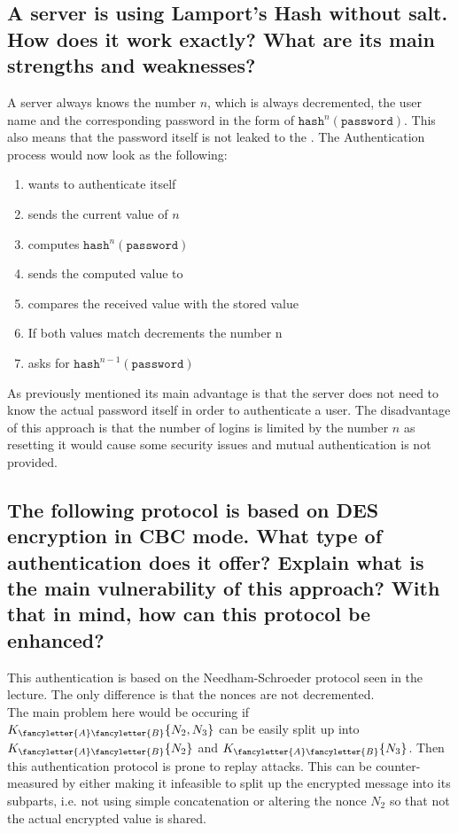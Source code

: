 \documentclass{report}
\begin{document}
		\subsection{A server is using Lamport’s Hash without salt. How does it work exactly? What are its main strengths and weaknesses?}
		\startsubsection
			A server  always knows the number $n$, which is always decremented, the user name and the corresponding password in the form of $\texttt{hash}^n(\texttt{password})$. This also means that the password itself is not leaked to the . The Authentication process would now look as the following:
			\begin{enumerate}
				\item {} wants to authenticate itself
				\item {} sends  the current value of $n$
				\item {} computes $\texttt{hash}^n(\texttt{password})$
				\item {} sends the computed value to 
				\item {} compares the received value with the stored value
				\item If both values match  decrements the number n
				\item {} asks  for $\texttt{hash}^{n-1}(\texttt{password})$
			\end{enumerate}
			As previously mentioned its main advantage is that the server  does not need to know the actual password itself in order to authenticate a user. The disadvantage of this approach is that the number of logins is limited by the number $n$ as resetting it would cause some security issues and mutual authentication is not provided.
		\closesection
		
		\subsection{The following protocol is based on DES encryption in CBC mode. What type of authentication does it offer? Explain what is the main vulnerability of this approach? With that in mind, how can this protocol be enhanced?}
		\startsubsection
			This authentication is based on the Needham-Schroeder protocol seen in the lecture. The only difference is that the nonces are not decremented. \\
			The main problem here would be occuring if $K_{\fancyletter{A}\fancyletter{B}}\{N_2,N_3\}$ can be easily split up into $K_{\fancyletter{A}\fancyletter{B}}\{N_2\}$ and $K_{\fancyletter{A}\fancyletter{B}}\{N_3\}$. Then this authentication protocol is prone to replay attacks. This can be counter-measured by either making it infeasible to split up the encrypted message into its subparts, i.e. not using simple concatenation or altering the nonce $N_2$ so that not the actual encrypted value is shared.
		\closesection
	\closesection
\end{document}
